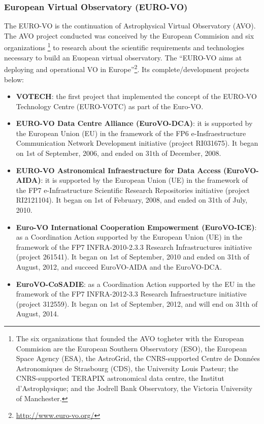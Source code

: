 \subsubsection{European Virtual Observatory (EURO-VO)}
The EURO-VO \cite{website:euro-vo-home} is the continuation of Astrophysical
Virtual Observatory (AVO). The AVO project conducted was conceived by the
European Commision and six organizations \footnote{The six organizations that
founded the AVO togheter with the European Commision are the European Southern
Observatory (ESO), the European Space Agency (ESA), the AstroGrid, the
CNRS-supported Centre de Données Astronomiques de Strasbourg (CDS), the
University Louis Pasteur; the CNRS-supported TERAPIX astronomical data centre,
the Institut d'Astrophysique; and the Jodrell Bank Observatory, the Victoria
University of Manchester.} to research about the scientific requirements and
technologies necessary to build an Euopean virtual observatory. The ``EURO-VO
aims at deploying and operational VO in
Europe''\footnote{\url{http://www.euro-vo.org/}}. Its complete/development
projects below:

\begin{itemize}
\item \textbf{VOTECH}:
the first project that implemented the concept of the EURO-VO Technology Centre
(EURO-VOTC) as part of the Euro-VO.

\item \textbf{EURO-VO Data Centre Alliance (EuroVO-DCA)}:
it is supported by the European Union (EU) in the framework of the FP6
e-Insfraestructure Communication Network Development initiative (project
RI031675). It began on 1st of September, 2006, and ended on 31th of December,
2008.

\item \textbf{EURO-VO Astronomical Infraestructure for Data Access
              (EuroVO-AIDA)}:
it is supported by the European Union (UE) in the framework of the FP7
e-Infrastructure Scientific Research Repositories initiative (project
RI2121104). It began on 1st of February, 2008, and ended on 31th of July, 2010.

\item \textbf{Euro-VO International Cooperation Empowerment (EuroVO-ICE)}:
as a Coordination Action supported by the European Union (UE) in the framework
of the FP7 INFRA-2010-2.3.3 Research Infrastructures initiative (project
261541). It began on 1st of September, 2010 and ended on 31th of August, 2012,
and succeed EuroVO-AIDA and the EuroVO-DCA.

\item \textbf{EuroVO-CoSADIE}:
as a Coordination Action supported by the EU in the framework of the FP7
INFRA-2012-3.3 Research Infraestructure initiative (project 312559). It began on
1st of September, 2012, and will end on 31th of August, 2014.
\end{itemize}

